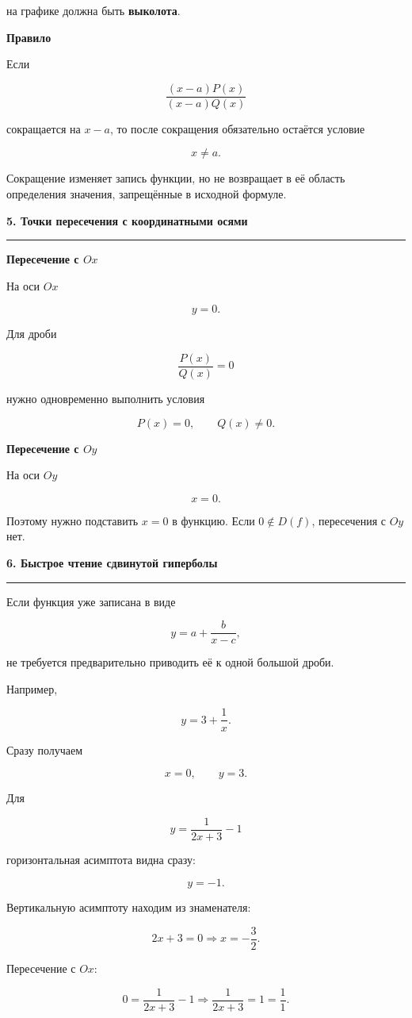 \documentclass[a4paper,12pt]{article}
\newcommand{\sectiontitle}[1]{%
    \par\vspace{0.65em}
    {\Large\bfseries\color{darkaccent}#1}\par
    \vspace{0.15em}
    {\color{accent}\rule{\linewidth}{0.65pt}}\par
    \vspace{0.3em}
}
\newcommand{\subsectiontitle}[1]{%
    \par\vspace{0.45em}
    {\large\bfseries\color{darkaccent}#1}\par
    \vspace{0.1em}
}
\begin{document}
на графике должна быть \textbf{выколота}.

\subsectiontitle{Правило}

Если

\[
\frac{(x-a)P(x)}{(x-a)Q(x)}
\]

сокращается на \(x-a\), то после сокращения обязательно остаётся условие

\[
\boxed{x\ne a}.
\]

Сокращение изменяет запись функции, но не возвращает в её область определения
значения, запрещённые в исходной формуле.

\sectiontitle{5. Точки пересечения с координатными осями}

\subsectiontitle{Пересечение с \(Ox\)}

На оси \(Ox\)

\[
y=0.
\]

Для дроби

\[
\frac{P(x)}{Q(x)}=0
\]

нужно одновременно выполнить условия

\[
\boxed{P(x)=0},
\qquad
\boxed{Q(x)\ne0}.
\]

\subsectiontitle{Пересечение с \(Oy\)}

На оси \(Oy\)

\[
x=0.
\]

Поэтому нужно подставить \(x=0\) в функцию. Если \(0\notin D(f)\),
пересечения с \(Oy\) нет.

\sectiontitle{6. Быстрое чтение сдвинутой гиперболы}

Если функция уже записана в виде

\[
y=a+\frac{b}{x-c},
\]

не требуется предварительно приводить её к одной большой дроби.

Например,

\[
y=3+\frac1x.
\]

Сразу получаем

\[
\boxed{x=0},
\qquad
\boxed{y=3}.
\]

Для

\[
y=\frac1{2x+3}-1
\]

горизонтальная асимптота видна сразу:

\[
\boxed{y=-1}.
\]

Вертикальную асимптоту находим из знаменателя:

\[
2x+3=0
\Longrightarrow
\boxed{x=-\frac32}.
\]

Пересечение с \(Ox\):

\[
0=\frac1{2x+3}-1
\Longrightarrow
\frac1{2x+3}=1=\frac11.
\]
\end{document}
